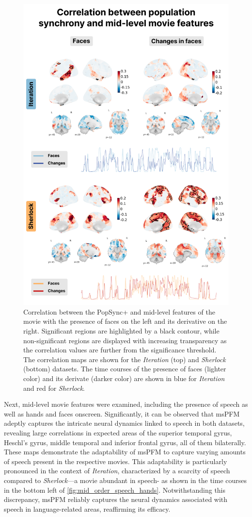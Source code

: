 \begin{figure}[!ht]
\centering
\includegraphics[width=0.7\linewidth]{figures/multi_subject/mid_order_faces.png}
\caption[]{Correlation between the PopSync+ and mid-level features of the movie
with the presence of faces on the left and its derivative on the right.
Significant regions are highlighted by a black contour, while non-significant
regions are displayed with increasing transparency as the correlation values are
further from the significance threshold. The correlation maps are shown for the
\textit{Iteration} (top) and \textit{Sherlock} (bottom) datasets. The time
courses of the presence of faces (lighter color) and its derivate (darker color)
are shown in blue for \textit{Iteration} and red for \textit{Sherlock}.}
\label{fig:mid_order_faces}
\end{figure}

Next, mid-level movie features were examined, including the presence of speech
as well as hands and faces onscreen. Significantly, it can be observed that
msPFM adeptly captures the intricate neural dynamics linked to speech in both
datasets, revealing large correlations in expected areas of the superior
temporal gyrus, Heschl's gyrus, middle temporal and inferior frontal gyrus, all
of them bilaterally. These maps demonstrate the adaptability of msPFM to capture
varying amounts of speech present in the respective movies. This adaptability is
particularly pronounced in the context of \textit{Iteration}, characterized by a
scarcity of speech compared to \textit{Sherlock}---a movie abundant in speech-
as shown in the time courses in the bottom left of
\cref{fig:mid_order_speech_hands}. Notwithstanding this discrepancy, msPFM
reliably captures the neural dynamics associated with speech in language-related
areas, reaffirming its efficacy. 

